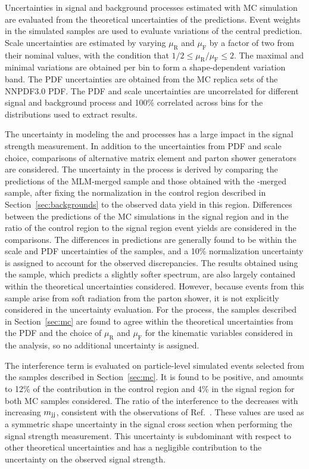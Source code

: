 Uncertainties in signal and background processes estimated with
MC simulation are evaluated from the theoretical uncertainties 
of the predictions. 
Event weights in the simulated samples are used to evaluate 
variations of the central prediction.
Scale uncertainties are estimated by varying
$\mu_{\mathrm{R}}$ and $\mu_{\mathrm{F}}$ by a factor of two from their
nominal values, with the condition that $1/2 \le \mu_{\mathrm{R}}/\mu_{\mathrm{F}} \le 2$.
The maximal and minimal variations are obtained
per bin to form a shape-dependent variation band.
The PDF uncertainties are obtained from the MC replica sets 
of the NNPDF3.0 PDF. 
The PDF and scale uncertainties are uncorrelated for different signal and
background process and 100\% correlated across bins for the distributions
used to extract results.

The uncertainty in modeling the \EWWZ and \QCDWZ
processes has a large impact in the \EWWZ signal strength measurement.
In addition to the uncertainties from PDF and scale choice, 
comparisons of alternative matrix element and parton shower generators are
considered.
The uncertainty in the \QCDWZ process is derived by
comparing the predictions of the MLM-merged sample and those obtained with the \FxFx-merged sample,
after fixing the normalization in the control region described in Section~\ref{sec:backgrounds}
to the observed data yield in this region.
Differences between the predictions of the MC simulations
in the signal region and in the ratio
of the control region to the signal region event yields
are considered in the comparisons.
The differences in predictions are generally found to be
within the scale and PDF uncertainties of the samples,
and a 10\% normalization uncertainty is assigned to account for
the observed discrepancies.
The results obtained using the \POWHEG sample,
which predicts a slightly softer {\mjj} spectrum, are also largely contained 
within the theoretical uncertainties considered.
However, because \WZjj events from this sample arise from
soft radiation from the parton shower, it is 
not explicitly considered in the uncertainty evaluation.
For the \EWWZ process, the samples described in Section~\ref{sec:mc}
are found to agree within
the theoretical uncertainties from the PDF and the choice of 
$\mu_{\mathrm{R}}$ and $\mu_{\mathrm{F}}$ 
for the kinematic variables considered in the analysis,
so no additional uncertainty is
assigned. 

The interference term is evaluated on particle-level simulated events
selected from the samples described in Section~\ref{sec:mc}. 
It is found to be positive, and amounts to 12\% 
of the \EWWZ contribution in the control region and 4\% in the signal region
for both MC samples considered. 
The ratio of the interference to the \EWWZ 
decreases with increasing $m_{\mathrm{jj}}$, consistent with the observations of Ref.~\cite{leshouches2017}.
These values are used as a symmetric shape uncertainty in the 
signal cross section when performing the 
\EWWZ signal strength measurement.
This uncertainty is subdominant with respect to other theoretical uncertainties 
and has a negligible contribution to the uncertainty 
on the observed \EWWZ signal strength.

